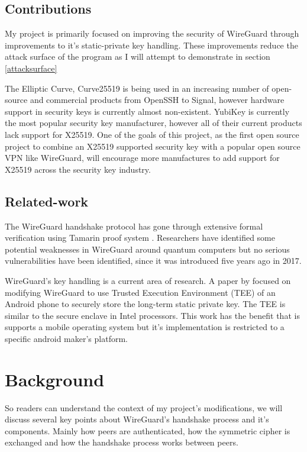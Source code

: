 \documentclass [11pt, proquest] {uwthesis}[2020/02/24]
\begin{document}
\section {Contributions}
My project is primarily focused on improving the security of WireGuard through improvements to it's static-private key handling. These improvements reduce the attack surface of the program as I will attempt to demonstrate in section \ref{attacksurface}

The Elliptic Curve, Curve25519 is being used in an increasing number of open-source and commercial products from OpenSSH to Signal\cite{noauthor_things_2022}, however hardware support in 
security keys is currently almost non-existent. YubiKey is currently the most popular security key manufacturer, however all of their current products lack support for X25519. One of the goals of this project, as the first open source project to combine an X25519 supported security key with a popular open source VPN like WireGuard, will encourage more manufactures to add support for X25519 across the security key industry.

\section {Related-work}
\label{related_work}
The WireGuard handshake protocol has gone through extensive formal verification using Tamarin proof system \cite{donenfeld_formal_2018}. Researchers have identified some potential weaknesses in WireGuard around quantum computers\cite{hulsing_post-quantum_2021} but no serious vulnerabilities have been identified, since it was introduced five years ago in 2017.

WireGuard's key handling is a current area of research. A paper by \cite{wu_sewg_2020} focused on modifying WireGuard to use Trusted Execution Environment (TEE) of an Android phone to securely store the long-term static private key. The TEE is similar to the secure enclave in Intel processors. This work has the benefit that is supports a mobile operating system but it's implementation is restricted to a specific android maker's platform.


\chapter {Background}
\label{background}
So readers can understand the context of my project's modifications, we will discuss several key points about WireGuard's handshake process and it's components. Mainly how peers are authenticated, how the symmetric cipher is exchanged and how the handshake process works between peers.
\end{document}
